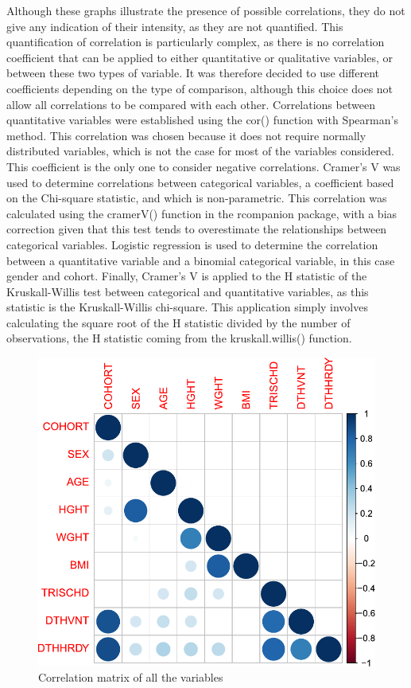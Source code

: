 \documentclass[a4paper, 11pt]{article}
\begin{document}
\begin{multicols}{2}
Although these graphs illustrate the presence of possible correlations, they do not give any indication of their intensity, as they are not quantified. This quantification of correlation is particularly complex, as there is no correlation coefficient that can be applied to either quantitative or qualitative variables, or between these two types of variable. It was therefore decided to use different coefficients depending on the type of comparison, although this choice does not allow all correlations to be compared with each other. 
Correlations between quantitative variables were established using the cor() function with Spearman's method. This correlation was chosen because it does not require normally distributed variables, which is not the case for most of the variables considered. This coefficient is the only one to consider negative correlations.
Cramer's V was used to determine correlations between categorical variables, a coefficient based on the Chi-square statistic, and which is non-parametric. This correlation was calculated using the cramerV() function in the rcompanion package, with a bias correction given that this test tends to overestimate the relationships between categorical variables.
Logistic regression is used to determine the correlation between a quantitative variable and a binomial categorical variable, in this case gender and cohort. Finally, Cramer's V is applied to the H statistic of the Kruskall-Willis test between categorical and quantitative variables, as this statistic is the Kruskall-Willis chi-square. This application simply involves calculating the square root of the H statistic divided by the number of observations, the H statistic coming from the kruskall.willis() function.

\begin{figure}[H]
	\centering
	\includegraphics[width=\columnwidth]{figures/clinical_correlation_plots/corrected_allCorrelations2}
	\caption{Correlation matrix of all the variables}
	\label{fig:allCor}
\end{figure}


\end{multicols}
\end{document}

